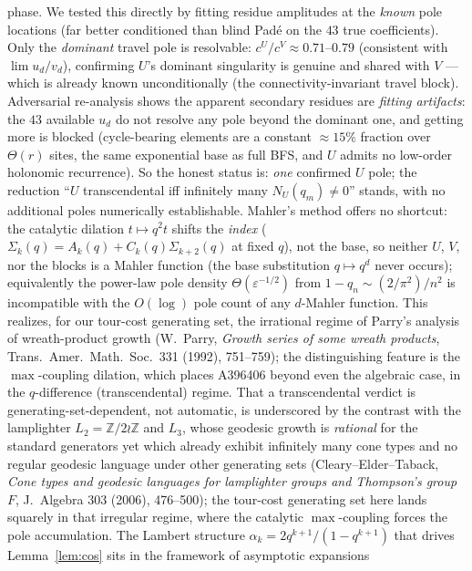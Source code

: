 \documentclass[11pt,a4paper]{article}
\theoremstyle{remark}
\theoremstyle{plain}
\begin{document}
phase.  We tested this directly by fitting residue amplitudes at the \emph{known}
pole locations (far better conditioned than blind Pad\'e on the $43$ true
coefficients). Only the \emph{dominant} travel pole is resolvable: $c^U/c^V\approx0.71$--$0.79$
(consistent with $\lim u_d/v_d$), confirming $U$'s dominant singularity is genuine and shared
with $V$ --- which is already known unconditionally (the connectivity-invariant travel block).
Adversarial re-analysis shows the apparent secondary residues are \emph{fitting artifacts}: the
$43$ available $u_d$ do not resolve any pole beyond the dominant one, and getting more is blocked
(cycle-bearing elements are a constant $\approx15\%$ fraction over $\Theta(r)$ sites, the same
exponential base as full BFS, and $U$ admits no low-order holonomic recurrence). So the honest
status is: \emph{one} confirmed $U$ pole; the reduction ``$U$ transcendental iff infinitely many
$N_U(q_m)\ne0$'' stands, with no additional poles numerically establishable.  Mahler's method offers no shortcut: the catalytic dilation
$t\mapsto q^2t$ shifts the \emph{index} ($\Sigma_k(q)=A_k(q)+C_k(q)\Sigma_{k+2}(q)$
at fixed $q$), not the base, so neither $U$, $V$, nor the blocks is a Mahler
function (the base substitution $q\mapsto q^d$ never occurs); equivalently the
power-law pole density $\Theta(\varepsilon^{-1/2})$ from $1-q_n\sim(2/\pi^2)/n^2$
is incompatible with the $O(\log)$ pole count of any $d$-Mahler function.  This
realizes, for our tour-cost generating set, the
irrational regime of Parry's analysis of wreath-product growth
(W.~Parry, \emph{Growth series of some wreath products}, Trans.\ Amer.\
Math.\ Soc.\ 331 (1992), 751--759); the distinguishing feature is the
$\max$-coupling dilation, which places A396406 beyond even the algebraic
case, in the $q$-difference (transcendental) regime.  That a transcendental
verdict is generating-set-dependent, not automatic, is underscored by the
contrast with the lamplighter $L_2=\mathbb Z/2\wr\mathbb Z$ and $L_3$, whose
geodesic growth is \emph{rational} for the standard generators yet which
already exhibit infinitely many cone types and no regular geodesic language
under other generating sets (Cleary--Elder--Taback, \emph{Cone types and
geodesic languages for lamplighter groups and Thompson's group $F$}, J.\
Algebra 303 (2006), 476--500); the tour-cost generating set here lands
squarely in that irregular regime, where the catalytic $\max$-coupling forces
the pole accumulation.  The Lambert structure $\alpha_k=2q^{k+1}/(1-q^{k+1})$
that drives Lemma~\ref{lem:cos} sits in the framework of asymptotic expansions
\end{document}
